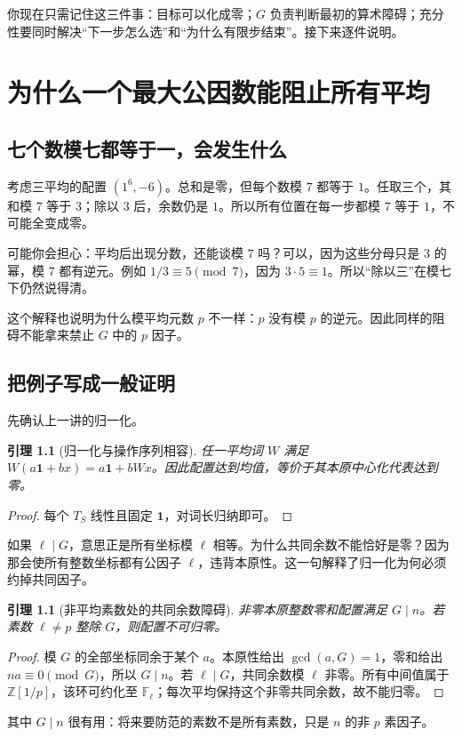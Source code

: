 \documentclass[11pt,a4paper,oneside,openany]{book}
\newcommand{\Z}{\mathbb Z}
\newcommand{\F}{\mathbb F}
\newtheorem{lemma}[theorem]{引理}
\theoremstyle{definition}
\numberwithin{equation}{chapter}
\begin{document}
你现在只需记住这三件事：目标可以化成零；$G$ 负责判断最初的算术障碍；充分性要同时解决“下一步怎么选”和“为什么有限步结束”。接下来逐件说明。

\chapter{为什么一个最大公因数能阻止所有平均}\label{sec:obstruction}
\section{七个数模七都等于一，会发生什么}
考虑三平均的配置 $(1^6,-6)$。总和是零，但每个数模 $7$ 都等于 $1$。任取三个，其和模 $7$ 等于 $3$；除以 $3$ 后，余数仍是 $1$。所以所有位置在每一步都模 $7$ 等于 $1$，不可能全变成零。

可能你会担心：平均后出现分数，还能谈模 $7$ 吗？可以，因为这些分母只是 $3$ 的幂，模 $7$ 都有逆元。例如 $1/3\equiv5\pmod7$，因为 $3\cdot5\equiv1$。所以“除以三”在模七下仍然说得清。

这个解释也说明为什么模平均元数 $p$ 不一样：$p$ 没有模 $p$ 的逆元。因此同样的阻碍不能拿来禁止 $G$ 中的 $p$ 因子。

\section{把例子写成一般证明}
先确认上一讲的归一化。
\begin{lemma}[归一化与操作序列相容]\label{lem:affine}
任一平均词 $W$ 满足 $W(a\mathbf1+bx)=a\mathbf1+bWx$。因此配置达到均值，等价于其本原中心化代表达到零。
\end{lemma}
\begin{proof}
每个 $T_S$ 线性且固定 $\mathbf1$，对词长归纳即可。
\end{proof}
如果 $\ell\mid G$，意思正是所有坐标模 $\ell$ 相等。为什么共同余数不能恰好是零？因为那会使所有整数坐标都有公因子 $\ell$，违背本原性。这一句解释了归一化为何必须约掉共同因子。
\begin{lemma}[非平均素数处的共同余数障碍]\label{lem:obstruction}
非零本原整数零和配置满足 $G\mid n$。若素数 $\ell\ne p$ 整除 $G$，则配置不可归零。
\end{lemma}
\begin{proof}
模 $G$ 的全部坐标同余于某个 $a$。本原性给出 $\gcd(a,G)=1$，零和给出 $na\equiv0\pmod G$，所以 $G\mid n$。若 $\ell\mid G$，共同余数模 $\ell$ 非零。所有中间值属于 $\Z[1/p]$，该环可约化至 $\F_\ell$；每次平均保持这个非零共同余数，故不能归零。
\end{proof}
其中 $G\mid n$ 很有用：将来要防范的素数不是所有素数，只是 $n$ 的非 $p$ 素因子。
\end{document}
